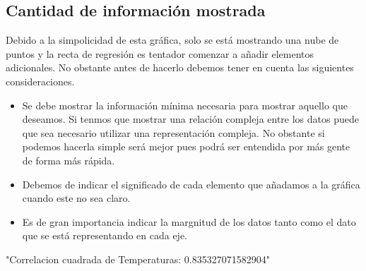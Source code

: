 \documentclass [a4paper] {article}
\begin{document}
\subsection{Cantidad de información mostrada}
Debido a la simpolicidad de esta gráfica, solo se está mostrando una nube de puntos y la recta de regresión es tentador comenzar a añadir elementos adicionales.
No obstante antes de hacerlo debemos tener en cuenta las siguientes consideraciones.
\begin{itemize}
  \item Se debe mostrar la información mínima necesaria para mostrar aquello que deseamos.
        Si tenmos que mostrar una relación compleja entre los datos puede que sea necesario utilizar una representación compleja.
        No obstante si podemos hacerla simple será mejor pues podrá ser entendida por más gente de forma más rápida.
  \item Debemos de indicar el significado de cada elemento que añadamos a la gráfica cuando este no sea claro.
  \item Es de gran importancia indicar la margnitud de los datos tanto como el dato que se está representando en cada eje.
\end{itemize}


\begin{Schunk}
\begin{Soutput}
[1] "Correlacion cuadrada de Temperaturas: 0.835327071582904"
\end{Soutput}
\end{Schunk}
\end{document}
